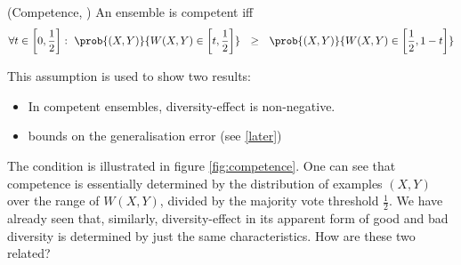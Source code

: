 \documentclass[../main.tex]{subfiles}
\begin{document}
\begin{definition} (Competence, \cite{theisen}) An ensemble is competent iff
$$
\forall t \in \left[ 0, \frac{1}{2} \right]: ~ \prob{(X,Y) }{W(X,Y)  \in \left[ t, \frac{1}{2} \right]} ~ ~  \geq ~ ~ \prob{(X,Y) }{W(X,Y) \in \left[ \frac{1}{2}, 1-t \right]}
$$
\end{definition}
This assumption is used to show two results:
\begin{itemize}
	\item In competent ensembles, diversity-effect is non-negative.
	\item bounds on the generalisation error (see \ref{later}) %
\end{itemize}
The condition is illustrated in figure \ref{fig:competence}.  One can see that competence is essentially determined by the distribution of examples $(X,Y)$ over the range of $W(X,Y)$, divided by the majority vote threshold $\frac{1}{2}$. We have already seen that, similarly, diversity-effect in its apparent form of good and bad diversity is determined by just the same characteristics. How are these two related?
\end{document}
